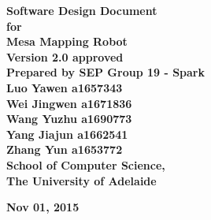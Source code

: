 \documentclass[11pt, a4paper]{article}
\begin{document}
\begin{titlepage}

\begin{center}

	\vspace{0.5 cm}
	\fontsize{35}{35}\selectfont\bf {Software Design Document}\\
	\vspace{0.5 cm}
	\huge{\bfseries for}\\
	\vspace{0.5 cm}
	\fontsize{35}{40}\selectfont\bf {Mesa Mapping Robot}\\
	
	\vspace{2cm}
	\Large\textbf{ Version 2.0 approved}\\
	
	\vspace{1.5cm}
	\Large\textbf {Prepared by SEP Group 19 - Spark\\
								Luo Yawen a1657343 \\
								Wei Jingwen a1671836 \\
								Wang Yuzhu a1690773 \\
								Yang Jiajun a1662541\\
								Zhang Yun a1653772}\\
		
	\vspace{2cm}
	\Large\textbf{ School of Computer Science,\\
								The University of Adelaide}\\
	\vspace{2cm}
	
	\Large\textbf{ Nov 01, 2015}\\

\end{center}

\end{titlepage}

\tableofcontents

\vspace{1cm}
\end{document}
